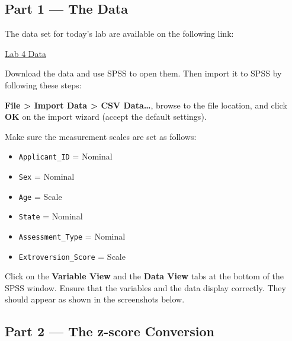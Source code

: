 \documentclass[
  letterpaper,
  DIV=11,
  numbers=noendperiod]{scrartcl}
\providecommand{\tightlist}{%
  \setlength{\itemsep}{0pt}\setlength{\parskip}{0pt}}\usepackage{longtable,booktabs,array}
\begin{document}
\subsection{Part 1 --- The Data}\label{part-1-the-data}

The data set for today's lab are available on the following link:

\href{datasets/personality.csv}{Lab 4 Data}

Download the data and use SPSS to open them. Then import it to SPSS by
following these steps:

\textbf{File \textgreater{} Import Data \textgreater{} CSV
Data\ldots{}}, browse to the file location, and click \textbf{OK} on the
import wizard (accept the default settings).

Make sure the measurement scales are set as follows:

\begin{itemize}
\tightlist
\item
  \texttt{Applicant\_ID} = Nominal
\item
  \texttt{Sex} = Nominal
\item
  \texttt{Age} = Scale
\item
  \texttt{State} = Nominal
\item
  \texttt{Assessment\_Type} = Nominal
\item
  \texttt{Extroversion\_Score} = Scale
\end{itemize}

\begin{tcolorbox}[enhanced jigsaw, opacityback=0, coltitle=black, title=\textcolor{quarto-callout-tip-color}{\faLightbulb}\hspace{0.5em}{Checkpoint}, titlerule=0mm, rightrule=.15mm, toprule=.15mm, opacitybacktitle=0.6, colbacktitle=quarto-callout-tip-color!10!white, colback=white, bottomtitle=1mm, arc=.35mm, toptitle=1mm, bottomrule=.15mm, colframe=quarto-callout-tip-color-frame, breakable, leftrule=.75mm, left=2mm]

Click on the \textbf{Variable View} and the \textbf{Data View} tabs at
the bottom of the SPSS window. Ensure that the variables and the data
display correctly. They should appear as shown in the screenshots below.

\end{tcolorbox}

\subsection{Part 2 --- The z-score
Conversion}\label{part-2-the-z-score-conversion}
\end{document}
